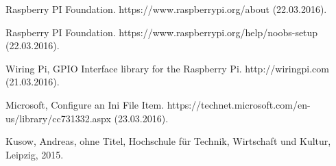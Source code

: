 \begin{thebibliography}{9}

Raspberry PI Foundation. https://www.raspberrypi.org/about (22.03.2016).

Raspberry PI Foundation. https://www.raspberrypi.org/help/noobs-setup (22.03.2016).

Wiring Pi, GPIO Interface library for the Raspberry Pi. http://wiringpi.com (21.03.2016).

Microsoft, Configure an Ini File Item. https://technet.microsoft.com/en-us/library/cc731332.aspx (23.03.2016).

Kusow, Andreas,
ohne Titel,
Hochschule für Technik, Wirtschaft und Kultur, Leipzig,
2015.

\end{thebibliography}